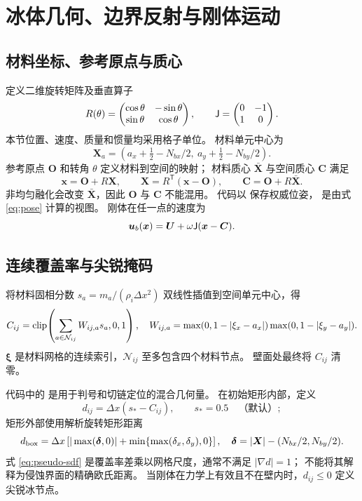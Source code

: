 \section{冰体几何、边界反射与刚体运动}
\label{sec:body}

\subsection{材料坐标、参考原点与质心}
定义二维旋转矩阵及垂直算子
\begin{equation}
 R(\theta)=\begin{pmatrix}\cos\theta&-\sin\theta\\\sin\theta&\cos\theta\end{pmatrix},
 \qquad \mathsf J=\begin{pmatrix}0&-1\\1&0\end{pmatrix}.
\end{equation}
本节位置、速度、质量和惯量均采用格子单位。
材料单元中心为
\begin{equation}
 \bm X_a=(a_x+\tfrac12-N_{bx}/2,\ a_y+\tfrac12-N_{by}/2).
\end{equation}
参考原点 $\bm O$ 和转角 $\theta$ 定义材料到空间的映射；
材料质心 $\bar{\bm X}$ 与空间质心 $\bm C$ 满足
\begin{equation}
 \bm x=\bm O+R\bm X,\qquad
 \bm X=R^{\mathsf T}(\bm x-\bm O),\qquad
 \bm C=\bm O+R\bar{\bm X}.
 \label{eq:pose}
\end{equation}
非均匀融化会改变 $\bar{\bm X}$，因此 $\bm O$ 与 $\bm C$ 不能混用。
代码以  保存权威位姿，
 是由式 \eqref{eq:pose} 计算的视图。
刚体在任一点的速度为
\begin{equation}
 \bm u_b(\bm x)=\bm U+\omega\mathsf J(\bm x-\bm C).
 \label{eq:wall-velocity}
\end{equation}

\subsection{连续覆盖率与尖锐掩码}
将材料固相分数 $s_a=m_a/(\rho_i\Delta x^2)$ 双线性插值到空间单元中心，得
\begin{equation}
 C_{ij}=\operatorname{clip}\!\left(\sum_{a\in\mathcal N_{ij}}W_{ij,a}s_a,0,1\right),
 \quad W_{ij,a}=\max(0,1-|\xi_x-a_x|)\max(0,1-|\xi_y-a_y|).
\end{equation}
$\bm\xi$ 是材料网格的连续索引，$\mathcal N_{ij}$ 至多包含四个材料节点。
壁面处最终将 $C_{ij}$ 清零。

代码中的  是用于判号和切链定位的混合几何量。
在初始矩形内部，定义
\begin{equation}
 d_{ij}=\Delta x(s_*-C_{ij}),\qquad s_*=0.5\quad\text{（默认）};
 \label{eq:pseudo-sdf}
\end{equation}
矩形外部使用解析旋转矩形距离
\begin{equation}
 d_{\rm box}=\Delta x\left[|\max(\bm\delta,0)|+
 \min\{\max(\delta_x,\delta_y),0\}\right],\quad
 \bm\delta=|\bm X|-(N_{bx}/2,N_{by}/2).
\end{equation}
式 \eqref{eq:pseudo-sdf} 是覆盖率差乘以网格尺度，通常不满足 $|\nabla d|=1$；
不能将其解释为侵蚀界面的精确欧氏距离。
当刚体在力学上有效且不在壁内时，$d_{ij}\leq0$ 定义尖锐冰节点。

